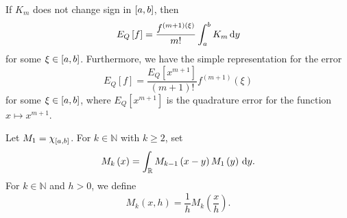 \begin{frame}
	\begin{theorem}
		If $K_{m}$ does not change sign in $\left[a,b\right]$, then
		\begin{equation*}
			E_{Q}\left[f\right]=
			\dfrac{f^{\left(m+1\right)\left(\xi\right)}}{m!}
			\int_{a}^{b}K_{m}
			\dl y
		\end{equation*}
		for some $\xi\in\left[a,b\right]$.
		Furthermore, we have the simple representation for the error
		\begin{equation*}
			E_{Q}\left[f\right]=
			\dfrac{E_{Q}\left[x^{m+1}\right]}{\left(m+1\right)!}
			f^{\left(m+1\right)}\left(\xi\right)
		\end{equation*}
		for some $\xi\in\left[a,b\right]$, where $E_{Q}\left[x^{m+1}\right]$
		is the quadrature error for the function $x\mapsto x^{m+1}$.
	\end{theorem}

	\begin{definition}
		Let $M_{1}=\chi_{\left[a,b\right]}$.
		For $k\in\mathbb{N}$ with $k\geq 2$, set
		\begin{equation*}
			M_{k}\left(x\right)=
			\int_{\mathbb{R}}
			M_{k-1}\left(x-y\right)M_{1}\left(y\right)
			\dl y.
		\end{equation*}
		For $k\in\mathbb{N}$ and $h>0$, we define
		\begin{equation*}
			M_{k}\left(x,h\right)=
			\dfrac{1}{h}
			M_{k}
			\left(\dfrac{x}{h}\right).
		\end{equation*}
	\end{definition}
\end{frame}

